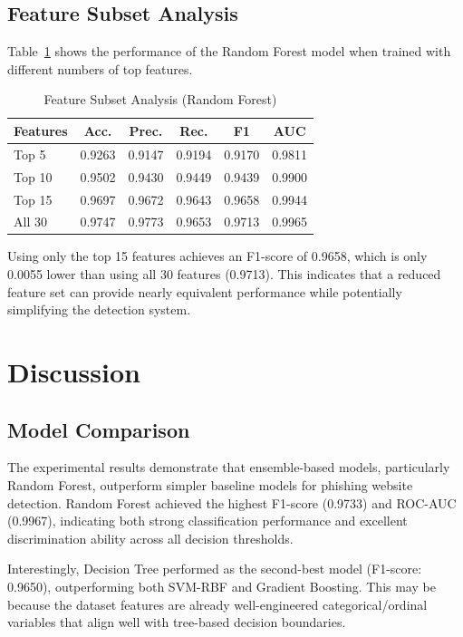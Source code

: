 \documentclass[conference]{IEEEtran}
\begin{document}
\subsection{Feature Subset Analysis}

Table~\ref{tab:topk} shows the performance of the Random Forest model when trained with different numbers of top features.

\begin{table}[htbp]
\caption{Feature Subset Analysis (Random Forest)}
\label{tab:topk}
\centering
\begin{tabular}{lccccc}
\toprule
\textbf{Features} & \textbf{Acc.} & \textbf{Prec.} & \textbf{Rec.} & \textbf{F1} & \textbf{AUC} \\
\midrule
Top 5 & 0.9263 & 0.9147 & 0.9194 & 0.9170 & 0.9811 \\
Top 10 & 0.9502 & 0.9430 & 0.9449 & 0.9439 & 0.9900 \\
Top 15 & 0.9697 & 0.9672 & 0.9643 & 0.9658 & 0.9944 \\
All 30 & 0.9747 & 0.9773 & 0.9653 & 0.9713 & 0.9965 \\
\bottomrule
\end{tabular}
\end{table}

Using only the top 15 features achieves an F1-score of 0.9658, which is only 0.0055 lower than using all 30 features (0.9713). This indicates that a reduced feature set can provide nearly equivalent performance while potentially simplifying the detection system.

\section{Discussion}

\subsection{Model Comparison}

The experimental results demonstrate that ensemble-based models, particularly Random Forest, outperform simpler baseline models for phishing website detection. Random Forest achieved the highest F1-score (0.9733) and ROC-AUC (0.9967), indicating both strong classification performance and excellent discrimination ability across all decision thresholds.

Interestingly, Decision Tree performed as the second-best model (F1-score: 0.9650), outperforming both SVM-RBF and Gradient Boosting. This may be because the dataset features are already well-engineered categorical/ordinal variables that align well with tree-based decision boundaries.
\end{document}
